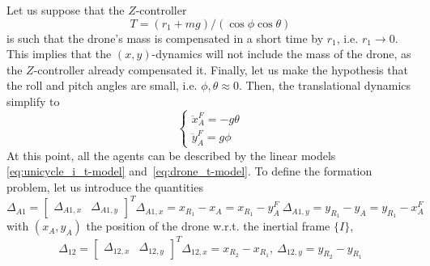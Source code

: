 \documentclass{ifacconf}
\begin{document}
Let us suppose that the $Z$-controller 
\begin{equation}
    T = (r_1 + mg) / (\cos \phi \cos \theta)
\end{equation}
is such that the drone's mass is compensated in a short time
by $r_1$, i.e. $r_1 \to 0$.
This implies that the $(x,y)$-dynamics will not include the mass of the drone,
as the $Z$-controller already compensated it.
Finally, let us make the hypothesis that the roll and pitch angles 
are small, i.e. $\phi,\theta \approx 0$.
Then, the translational dynamics simplify to 
\begin{equation}
    \begin{cases}
        \ddot{x}^F_A = -g\theta \\
        \ddot{y}^F_A = g\phi
    \end{cases}
    \label{eq:drone_t-model}
\end{equation}
At this point, all the agents can be described by the linear models
\eqref{eq:unicycle_i_t-model} and~\eqref{eq:drone_t-model}.
To define the formation problem, let us introduce the quantities
\begin{subequations}
    \begin{equation}
        \Delta_{A1} = \begin{bmatrix}
            \Delta_{A1,x} & \Delta_{A1, y}
        \end{bmatrix}^T 
    \end{equation}
    \begin{equation}
        \Delta_{A1,x} = x_{R_1} - x_A = x_{R_1} - y^F_A \  
    \end{equation}
    \begin{equation}
        \Delta_{A1,y} = y_{R_1} - y_A = y_{R_1} - x^F_A
    \end{equation}
\end{subequations}
with $(x_A, y_A)$ the position of the drone w.r.t. the inertial frame $\{I\}$,
\begin{subequations}
    \begin{equation}
        \Delta_{12} = \begin{bmatrix}
        \Delta_{12,x} & \Delta_{12, y}
    \end{bmatrix}^T 
    \end{equation}
    \begin{equation}
        \Delta_{12,x} = x_{R_2} -  x_{R_1}, \ 
        \Delta_{12,y} = y_{R_2} -  y_{R_1}
    \end{equation}
\end{subequations}
\end{document}
